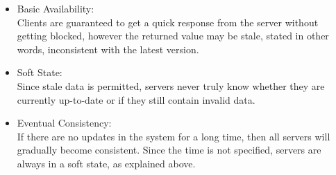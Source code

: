 \begin{itemize}
  \item Basic Availability:\\
 Clients are guaranteed to get a quick response from the server without getting blocked, however the returned value may be stale, stated in other words, inconsistent with the latest version.
  \item Soft State:\\
Since stale data is permitted, servers never truly know whether they are currently up-to-date or if they still contain invalid data.
  \item Eventual Consistency:\\
If there are no updates in the system for a long time, then all servers will gradually become consistent. Since the time is not specified, servers are always in a soft state, as explained above.
\end{itemize}

    

